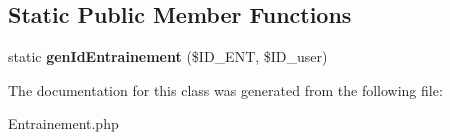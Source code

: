 \subsection*{Static Public Member Functions}
\begin{DoxyCompactItemize}
\item 
\mbox{\label{classentrainement_a7cff09e329476f9c8fb9cf9c4cb1ca8e}} 
static {\bfseries gen\+Id\+Entrainement} (\$I\+D\+\_\+\+E\+NT, \$I\+D\+\_\+user)
\end{DoxyCompactItemize}


The documentation for this class was generated from the following file\+:\begin{DoxyCompactItemize}
\item 
Entrainement.\+php\end{DoxyCompactItemize}
